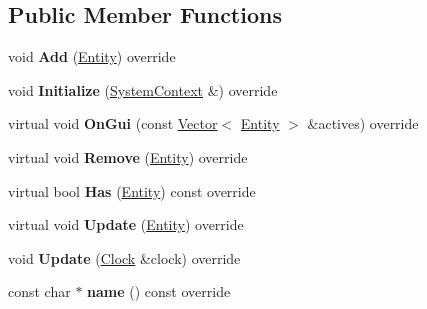 \subsection*{Public Member Functions}
\begin{DoxyCompactItemize}
\item 
\mbox{\label{classnabla_1_1_ocean_system_ab0dc504213443578aeddc1172dc3a2d2}} 
void {\bfseries Add} (\mbox{\hyperlink{structnabla_1_1_entity}{Entity}}) override
\item 
\mbox{\label{classnabla_1_1_ocean_system_a883148773ebcc34375b5f8d4328d22c6}} 
void {\bfseries Initialize} (\mbox{\hyperlink{structnabla_1_1_system_context}{System\+Context}} \&) override
\item 
\mbox{\label{classnabla_1_1_ocean_system_a9e90eee9f38ae6f7c83d47c6c873b497}} 
virtual void {\bfseries On\+Gui} (const \mbox{\hyperlink{classnabla_1_1_s_t_l_vector_ex}{Vector}}$<$ \mbox{\hyperlink{structnabla_1_1_entity}{Entity}} $>$ \&actives) override
\item 
\mbox{\label{classnabla_1_1_ocean_system_abce913429c4da03add04ead7b1505f1f}} 
virtual void {\bfseries Remove} (\mbox{\hyperlink{structnabla_1_1_entity}{Entity}}) override
\item 
\mbox{\label{classnabla_1_1_ocean_system_a21f026527a0478a53746e8da93f5a763}} 
virtual bool {\bfseries Has} (\mbox{\hyperlink{structnabla_1_1_entity}{Entity}}) const override
\item 
\mbox{\label{classnabla_1_1_ocean_system_ade9980d65065d17df8c21a591e70ab1e}} 
virtual void {\bfseries Update} (\mbox{\hyperlink{structnabla_1_1_entity}{Entity}}) override
\item 
\mbox{\label{classnabla_1_1_ocean_system_adeaba55d8dbab0c5bd73f9de2541fc55}} 
void {\bfseries Update} (\mbox{\hyperlink{classnabla_1_1_clock}{Clock}} \&clock) override
\item 
\mbox{\label{classnabla_1_1_ocean_system_a3a02ad653301121ead390caf669908d9}} 
const char $\ast$ {\bfseries name} () const override
\end{DoxyCompactItemize}


